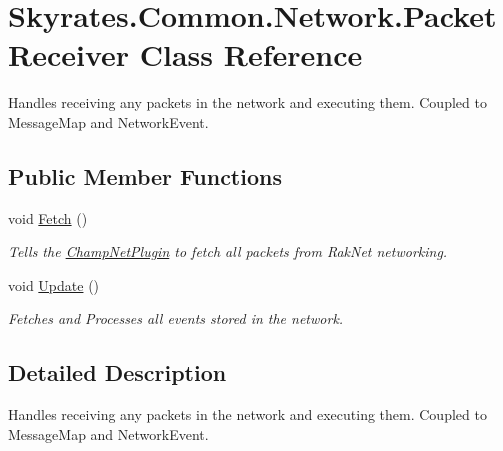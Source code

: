 \hypertarget{class_skyrates_1_1_common_1_1_network_1_1_packet_receiver}{\section{Skyrates.\-Common.\-Network.\-Packet\-Receiver Class Reference}
\label{class_skyrates_1_1_common_1_1_network_1_1_packet_receiver}
}


Handles receiving any packets in the network and executing them. Coupled to Message\-Map and Network\-Event.  


\subsection*{Public Member Functions}
\begin{DoxyCompactItemize}
\item 
void \hyperlink{class_skyrates_1_1_common_1_1_network_1_1_packet_receiver_a3daedc396ca491024972c1a64412bbef}{Fetch} ()
\begin{DoxyCompactList}\small\item\em Tells the \hyperlink{namespace_champ_net_plugin}{Champ\-Net\-Plugin} to fetch all packets from Rak\-Net networking. \end{DoxyCompactList}\item 
void \hyperlink{class_skyrates_1_1_common_1_1_network_1_1_packet_receiver_ad7f838654d2946d13e43453b061ef0ff}{Update} ()
\begin{DoxyCompactList}\small\item\em Fetches and Processes all events stored in the network. \end{DoxyCompactList}\end{DoxyCompactItemize}


\subsection{Detailed Description}
Handles receiving any packets in the network and executing them. Coupled to Message\-Map and Network\-Event. 



